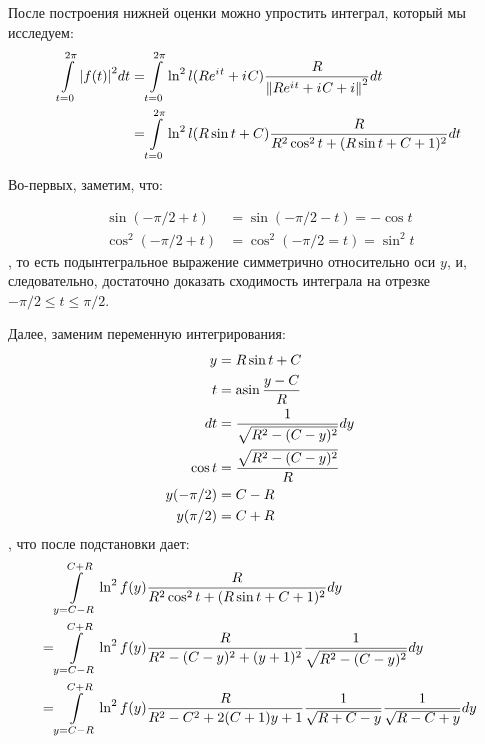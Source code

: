 После построения нижней оценки можно упростить интеграл, который мы исследуем:
\begin{align*}
       \int\limits_{t=0}^{2 \pi} \abs{f(t)}^2 dt
   = & \int\limits_{t = 0}^{2 \pi} \ln^2 l(R e^{{i\mkern1mu} t} + {i\mkern1mu} C) \frac{R}{\norm{R e^{{i\mkern1mu} t} + {i\mkern1mu} C + i}^2} dt
\\ = & \int\limits_{t = 0}^{2 \pi} \ln^2 l(R \sin t + C) \frac{R}{R^2 \cos^2 t + (R \sin t + C + 1)^2} dt
\end{align*}

Во-первых, заметим, что:

\begin{equation*}
\begin{aligned}
   \sin(-\pi/2 + t)   &= \sin(-\pi/2 - t) = - \cos t
\\ \cos^2(-\pi/2 + t) &= \cos^2(-\pi/2 = t) = \sin^2 t
\end{aligned}
\end{equation*}
, то есть подынтегральное выражение симметрично относительно оси $y$, и, следовательно, достаточно доказать сходимость интеграла на отрезке $-\pi/2 \le t \le \pi/2$.

Далее, заменим переменную интегрирования:
\begin{equation*}
\begin{aligned}
   y         &= R \sin t + C
\\ t         &= \asin \frac{y - C}{R}
\\ dt        &= \frac{1}{\sqrt{R^2 - (C - y)^2}} dy
\\ \cos t    &= \frac{\sqrt{R^2 - (C - y)^2}}{R}
\\ y(-\pi/2) &= C - R 
\\ y(\pi/2)  &= C + R 
\end{aligned}
\end{equation*}
, что после подстановки дает:
\begin{equation}\label{eq:int_f}
\resizebox{0.9\hsize}{!}{$
\begin{aligned}
    & \int\limits_{y = C - R}^{C + R} \ln^2 f(y) \frac{R}{R^2 \cos^2 t + (R \sin t + C + 1)^2} dy \\
=   & \int\limits_{y = C - R}^{C + R} \ln^2 f(y) \frac{R}{R^2 - (C - y)^2 + (y + 1)^2} \frac{1}{\sqrt{R^2 - (C - y)^2}} dy\\
=   & \int\limits_{y = C - R}^{C + R} \ln^2 f(y) \frac{R}{R^2 - C^2 + 2 (C + 1) y + 1} \frac{1}{\sqrt{R + C - y}} \frac{1}{\sqrt{R - C + y}}  dy\\
\end{aligned}
$}
\end{equation}

